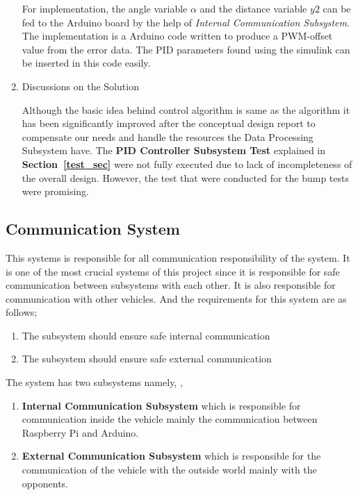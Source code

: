 \documentclass[a4paper,12pt]{article}
\begin{document}
\begin{enumerate}
	For implementation, the angle variable $\alpha$ and the distance variable $y2$ can be fed to the Arduino board by the help of \textit{Internal Communication Subsystem}. The implementation is a Arduino code written to produce a PWM-offset value from the error data. The PID parameters found using the simulink can be inserted in this code easily.
		

				
				\item {Discussions on the Solution}
	
	Although the basic idea behind control algorithm is same as the algorithm it has been significantly improved after the conceptual design report to compensate our needs and handle the resources the Data Processing Subsystem have. The \textbf{PID Controller Subsystem Test} explained in \textbf{Section~\ref{test_sec}} were not fully executed due to lack of incompleteness of the overall design. However, the test that were conducted for the bump tests were promising.	
			
			\end{enumerate}
		
		
			
		
		
			
			
		\subsection{Communication System}
			
		This systems is responsible for all communication responsibility of the system. It is one of the most crucial systems of this project since it is responsible for safe communication between subsystems with each other. It is also responsible for communication with other vehicles.	And the requirements for this system are as follows;		
		
			\begin{enumerate}
				\item The subsystem should ensure safe internal communication
				\item The subsystem should ensure safe external communication
			\end{enumerate}	
		
		
		The system has two subsystems namely, 	,
		
			\begin{enumerate}
				\item \textbf{Internal Communication Subsystem} which is responsible for communication inside the vehicle mainly the communication between Raspberry Pi and Arduino.						
				\item \textbf{External Communication Subsystem} which is responsible for the communication of the vehicle with the outside world mainly with the opponents.
			\end{enumerate}		
			
\end{document}
